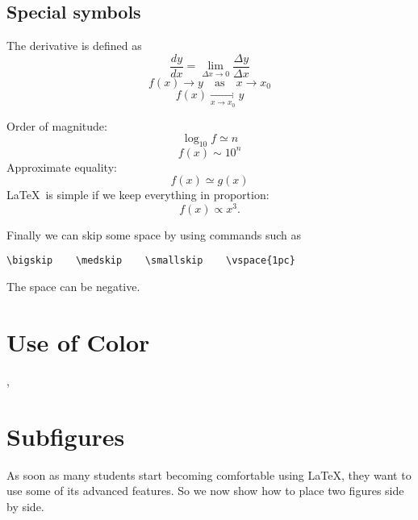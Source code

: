 \documentclass[12pt]{article}
\begin{document}
\subsection{Special symbols}

The derivative is defined as
\begin{equation}
\frac{dy}{dx} = \lim_{\Delta x \to 0} \frac{\Delta y}
{\Delta x}
\end{equation}
\begin{equation}
f(x) \to y \quad \mbox{as} \quad x \to
x_{0}
\end{equation}
\begin{equation}
f(x) \mathop {\longrightarrow}
\limits_{x \to x_0} y
\end{equation}

\noindent Order of magnitude:
\begin{equation}
\log_{10}f \simeq n
\end{equation}
\begin{equation}
f(x)\sim 10^{n}
\end{equation}
Approximate equality:
\begin{equation}
f(x)\simeq g(x)
\end{equation}
\LaTeX\ is simple if we keep everything in proportion:
\begin{equation}
f(x) \propto x^3 .
\end{equation}

Finally we can skip some space by using commands such as
\begin{verbatim}
\bigskip    \medskip    \smallskip    \vspace{1pc}
\end{verbatim}
The space can be negative.

\section{\color{red}Use of Color}

{\color{blue}{We can change colors for emphasis}},
{\color{green}{but}} {\color{cyan}{who is going pay for the ink?}}

\section{\label{morefig}Subfigures}

As soon as many students start becoming comfortable using \LaTeX, they want
to use some of its advanced features. So we now show how to place two
figures side by side.
\end{document}

